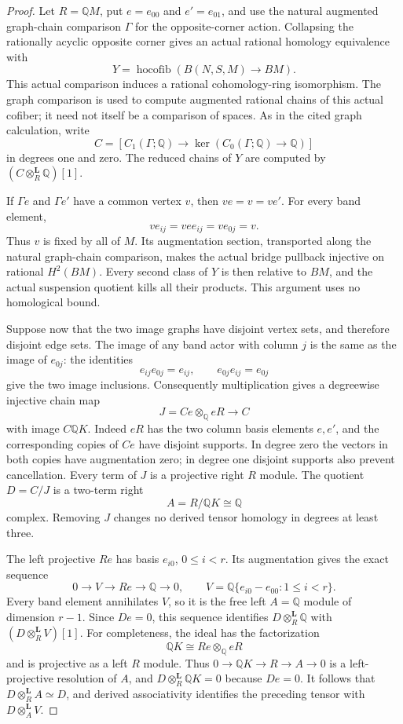 \begin{proof}
Let $R=\mathbb QM$, put $e=e_{00}$ and $e'=e_{01}$,
and use the natural augmented graph-chain comparison $\Gamma$
for the opposite-corner action.  Collapsing the rationally
acyclic opposite corner gives an actual rational homology
equivalence with
\[
 Y=\operatorname{hocofib}(B(N,S,M)\longrightarrow BM).
\]
This actual comparison induces a rational cohomology-ring
isomorphism.  The graph comparison is used to compute
augmented rational chains of this actual cofiber; it need
not itself be a comparison of spaces.
As in the cited graph calculation, write
\[
 C=[C_1(\Gamma;\mathbb Q)\longrightarrow
                  \ker(C_0(\Gamma;\mathbb Q)\to\mathbb Q)]
\]
in degrees one and zero.  The reduced chains of $Y$ are
computed by $(C\otimes_R^{\mathbf L}\mathbb Q)[1]$.

If $\Gamma e$ and $\Gamma e'$ have a common vertex $v$,
then $ve=v=ve'$.  For every band element,
\[
 ve_{ij}=vee_{ij}=ve_{0j}=v.
\]
Thus $v$ is fixed by all of $M$.  Its augmentation section,
transported along the natural graph-chain comparison,
makes the actual bridge pullback injective on rational
$H^2(BM)$.  Every second class of $Y$ is then relative
to $BM$, and the actual suspension quotient kills all
their products.  This argument uses no homological bound.

Suppose now that the two image graphs have disjoint
vertex sets, and therefore disjoint edge sets.  The
image of any band actor with column $j$ is the same
as the image of $e_{0j}$: the identities
\[
 e_{ij}e_{0j}=e_{ij},\qquad e_{0j}e_{ij}=e_{0j}
\]
give the two image inclusions.  Consequently multiplication
gives a degreewise injective chain map
\[
 J=Ce\otimes_{\mathbb Q}eR\longrightarrow C
\]
with image $C\mathbb QK$.  Indeed $eR$ has the two
column basis elements $e,e'$, and the corresponding
copies of $Ce$ have disjoint supports.  In degree zero
the vectors in both copies have augmentation zero;
in degree one disjoint supports also prevent cancellation.
Every term of $J$ is a projective right $R$ module.
The quotient $D=C/J$ is a two-term right
\[
 A=R/\mathbb QK\cong\mathbb Q
\]
complex.  Removing $J$ changes no derived tensor homology
in degrees at least three.

The left projective $Re$ has basis $e_{i0}$, $0\le i<r$.
Its augmentation gives the exact sequence
\[
 0\longrightarrow V\longrightarrow Re
   \longrightarrow\mathbb Q\longrightarrow0,
 \qquad
 V=\mathbb Q\{e_{i0}-e_{00}:1\le i<r\}.
\]
Every band element annihilates $V$, so it is the free
left $A=\mathbb Q$ module of dimension $r-1$.
Since $De=0$, this sequence identifies
$D\otimes_R^{\mathbf L}\mathbb Q$ with
$(D\otimes_R^{\mathbf L}V)[1]$.
For completeness, the ideal has the factorization
\[
 \mathbb QK\cong Re\otimes_{\mathbb Q}eR
\]
and is projective as a left $R$ module.
Thus $0\to\mathbb QK\to R\to A\to0$ is a
left-projective resolution of $A$, and
$D\otimes_R^{\mathbf L}\mathbb QK=0$ because $De=0$.
It follows that $D\otimes_R^{\mathbf L}A\simeq D$,
and derived associativity identifies the preceding
tensor with $D\otimes_A^{\mathbf L}V$.


\end{proof}
